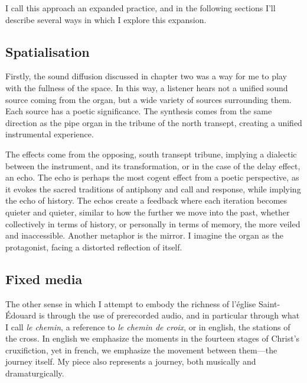 \documentclass[12pt,twoside,maitrise]{dms_ks}
\theoremstyle{definition}
\begin{document}
{I call this approach an expanded practice, and in the following sections I'll describe several ways in which I explore this expansion.

\subsection{Spatialisation}

Firstly, the sound diffusion discussed in chapter two was a way for me to play with the fullness of the space. 
In this way, a listener hears not a unified sound source coming from the organ, but a wide variety of sources surrounding them. 
Each source has a poetic significance. 
The synthesis comes from the same direction as the pipe organ in the tribune of the north transept, creating a unified instrumental experience.

The effects come from the opposing, south transept tribune, implying a dialectic between the instrument, and its transformation, or in the case of the delay effect, an echo. 
The echo is perhaps the most cogent effect from a poetic perspective, as it evokes the sacred traditions of antiphony and call and response, while implying the echo of history. 
The echos create a feedback where each iteration becomes quieter and quieter, similar to how the further we move into the past, whether collectively in terms of history, or personally in terms of memory, the more veiled and inaccessible. 
Another metaphor is the mirror. 
I imagine the organ as the protagonist, facing a distorted reflection of itself.

\subsection{Fixed media}

The other sense in which I attempt to embody the richness of l'église Saint-Édouard is through the use of prerecorded audio, and in particular through what I call \textit{le chemin}, a reference to \textit{le chemin de croix}, or in english, the stations of the cross. 
In english we emphasize the moments in the fourteen stages of Christ's cruxifiction, yet in french, we emphasize the movement between them---the journey itself. 
My piece also represents a journey, both musically and dramaturgically. 

}
\end{document}
